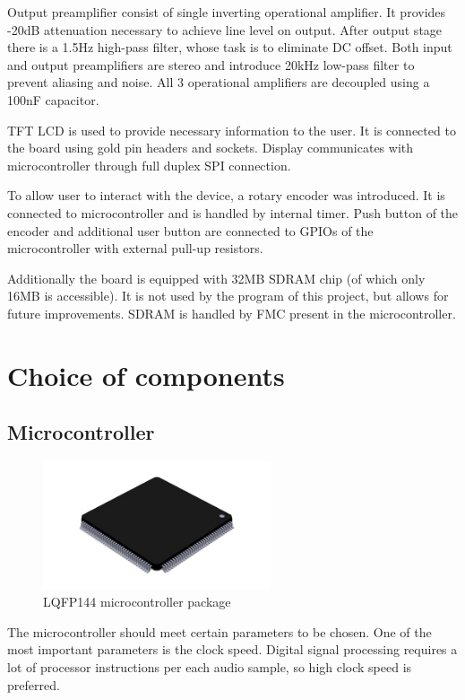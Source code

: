 \documentclass[a4paper,twoside,12pt]{book}
\begin{document}
Output preamplifier consist of single inverting operational amplifier.
It provides -20dB attenuation necessary to achieve line level on output.
After output stage there is a 1.5Hz high-pass filter,
whose task is to eliminate DC offset.
Both input and output preamplifiers are stereo and introduce 20kHz low-pass filter
to prevent aliasing and noise.
All 3 operational amplifiers are decoupled using a 100nF capacitor.
\cite{ST:DAC}

TFT LCD is used to provide necessary information to the user.
It is connected to the board using gold pin headers and sockets.
Display communicates with microcontroller through full duplex SPI connection.

To allow user to interact with the device, a rotary encoder was introduced.
It is connected to microcontroller and is handled by internal timer.
Push button of the encoder and additional user button are connected
to GPIOs of the microcontroller with external pull-up resistors.

Additionally the board is equipped with 32MB SDRAM chip
(of which only 16MB is accessible).
It is not used by the program of this project, but allows for future improvements.
SDRAM is handled by FMC present in the microcontroller.

\section{Choice of components}

\subsection {Microcontroller}

\begin{figure}[H]
    \centering
    \includegraphics[width=0.6\textwidth]{images/lqfp}
    \caption{LQFP144 microcontroller package}
    \label{fig:LQFP}
\end{figure}

The microcontroller should meet certain parameters to be chosen.
One of the most important parameters is the clock speed.
Digital signal processing requires a lot of processor instructions
per each audio sample, so high clock speed is preferred.
\end{document}
